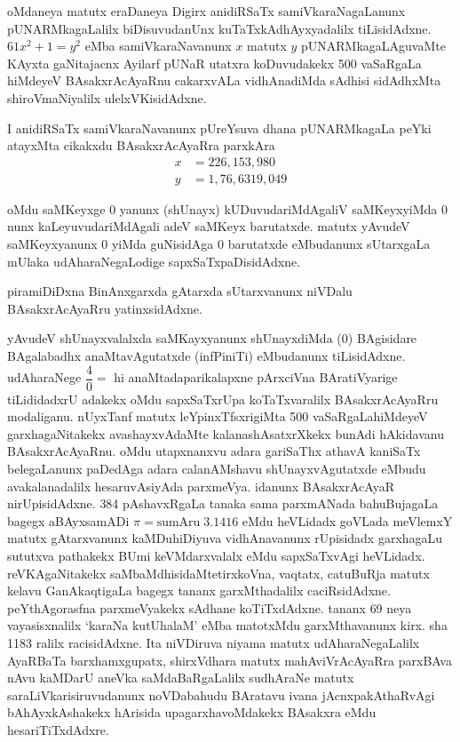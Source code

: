 oMdaneya matutx eraDaneya Digirx anidiRSaTx samiVkaraNagaLanunx pUNARMkagaLalilx biDisuvudanUnx kuTaTxkAdhAyxyadalilx tiLisidAdxne. $61 x^{2}+1=y^{2}$ eMba samiVkaraNavanunx $x$ matutx $y$ pUNARMkagaLAguvaMte KAyxta gaNitajacnx Ayilarf pUNaR utatxra koDuvudakekx {\rm 500} vaSaRgaLa hiMdeyeV BAsakxrAcAyaRnu cakarxvALa vidhAnadiMda sAdhisi sidAdhxMta shiroVmaNiyalilx ulelxVKisidAdxne.

I anidiRSaTx samiVkaraNavanunx pUreYsuva dhana pUNARMkagaLa peYki atayxMta cikakxdu BAsakxrAcAyaRra parxkAra 
\begin{align*}
x&=226, 153, 980\\ 
y&=1, 76, 6 319, 049
\end{align*}

oMdu saMKeyxge {\rm 0} yanunx (shUnayx) kUDuvudariMdAgaliV saMKeyxyiMda {\rm 0} nunx kaLeyuvudariMdAgali adeV saMKeyx barutatxde. matutx yAvudeV saMKeyxyanunx {\rm 0} yiMda guNisidAga {\rm 0} barutatxde eMbudanunx sUtarxgaLa mUlaka udAharaNegaLodige sapxSaTxpaDisi\-dAdxne.

piramiDiDxna BinAnxgarxda gAtarxda sUtarxvanunx niVDalu BAsakxrAcAyaRru yatinxsidAdxne.

yAvudeV shUnayxvalalxda saMKayxyanunx shUnayxdiMda {\rm (0)} BAgisidare BAgalabadhx anaMta\-vAgutatxde (infPiniTi) eMbudanunx tiLisidAdxne. udAharaNege $\dfrac{4}{0}=$ hi 
anaMtada\break parikalapxne pArxciVna BAratiVyarige tiLididadxrU adakekx oMdu sapxSaTxrUpa koTaTxva\-ralilx BAsakxrAcAyaRru modaliganu. nUyxTanf matutx leYpinxTfsxrigiMta {\rm 500} vaSaRgaLa\break hiMdeyeV garxhagaNitakekx avashayxvAdaMte kalanashAsatxrXkekx bunAdi hAkidavanu BAsakxrAcAyaRnu. oMdu utapxnanxvu adara gariSaThx athavA kaniSaTx belegaLanunx paDedAga adara calanAMshavu shUnayxvAgutatxde eMbudu avakalanadalilx hesaruvAsiyAda parxmeVya. idanunx BAsakxrAcAyaR nirUpisidAdxne. {\rm 384} pAshavxRgaLa tanaka sama parxmANada bahu\-BujagaLa bagegx aBAyxsamADi $\pi= \text{sumAru}\; 3.1416$ eMdu heVLidadx goVLada meVlemxY matutx gAtarxvanunx kaMDuhiDiyuva vidhAnavanunx rUpisidadx garxhagaLu sututxva pathakekx BUmi keVMdarxvalalx eMdu sapxSaTxvAgi heVLidadx. reVKAgaNitakekx saMbaMdhisidaMte\break tirxkoVna, vaqtatx, catuBuRja matutx kelavu GanAkaqtigaLa bagegx tananx garxMthadalilx caciRsidAdxne. peYthAgorasfna parxmeVyakekx sAdhane koTiTxdAdxne. tananx {\rm 69} neya vayasisxnalilx `karaNa kutU\-halaM' eMba matotxMdu garxMthavanunx kirx. sha {\rm 1183} ralilx racisidAdxne. Ita niVDiruva niyama matutx udAharaNegaLalilx AyaRBaTa barxhamxgupatx, shirxVdhara matutx mahA\-viVrAcAyaRra parxBAva nAvu kaMDarU aneVka saMdaBaRgaLalilx sudhAraNe matutx saraLiV\-karisiruvudanunx noVDabahudu BAratavu ivana jAcnxpakAthaRvAgi bAhAyxkAshakekx hAri\-sida upagarxhavoMdakekx BAsakxra eMdu hesariTiTxdAdxre.

